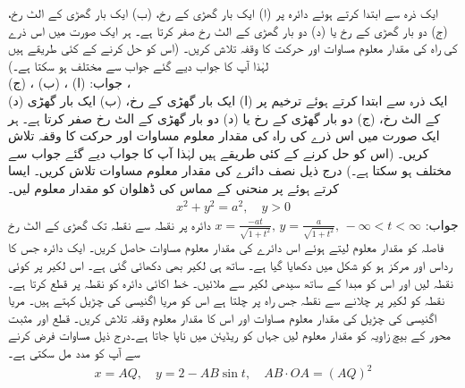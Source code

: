 ایک ذرہ  سے ابتدا کرتے ہوئے دائرہ   پر (ا) ایک بار گھڑی کے رخ، (ب) ایک بار گھڑی کے الٹ رخ، (ج) دو بار گھڑی کے رخ یا (د) دو بار گھڑی کے الٹ رخ صفر کرتا ہے۔ ہر ایک صورت میں اس ذرے کی راہ کی مقدار معلوم مساوات اور حرکت کا وقفہ تلاش کریں۔ (اس کو حل کرنے کے کئی طریقے ہیں لہٰذا آپ کا  جواب دیے گئے جواب سے مختلف ہو سکتا ہے۔)\\
جواب:\quad
(ا) ، (ب) ، (ج) ،\\ (د) 
ایک ذرہ  سے ابتدا کرتے ہوئے ترخیم   پر  (ا) ایک بار گھڑی کے رخ، (ب) ایک بار گھڑی کے الٹ رخ، (ج) دو بار گھڑی کے رخ یا (د) دو بار گھڑی کے الٹ رخ صفر کرتا ہے۔ ہر ایک صورت میں اس ذرے کی راہ کی مقدار معلوم مساوات اور حرکت کا وقفہ تلاش کریں۔ (اس کو حل کرنے کے کئی طریقے ہیں لہٰذا آپ کا  جواب دیے گئے جواب سے مختلف ہو سکتا ہے۔)
درج ذیل نصف دائرے کی مقدار معلوم مساوات تلاش کریں۔ ایسا کرتے  ہوئے  پر منحنی کے مماس کی ڈھلوان  کو مقدار معلوم لیں۔
\begin{align*}
x^2+y^2=a^2,\quad y>0
\end{align*}
جواب:\quad
$x=\tfrac{-at}{\sqrt{1+t^2}},\, y=\tfrac{a}{\sqrt{1+t^2}},\, -\infty<t<\infty$
دائرہ  پر نقطہ  سے نقطہ  تک گھڑی کے الٹ رخ  فاصلہ  کو مقدار معلوم لیتے ہوئے  اس دائرے کی مقدار معلوم مساوات حاصل کریں۔
ایک دائرہ جس کا رداس  اور مرکز  ہو کو شکل  میں دکھایا گیا ہے۔ ساتھ ہی لکیر  بھی دکھائی گئی ہے۔ اس لکیر پر کوئی نقطہ  لیں اور اس کو مبدا  کے ساتھ سیدھی لکیر سے ملائیں۔ خط  اکائی دائرہ کو نقطہ  پر قطع کرتا ہے۔ نقطہ  کو لکیر  پر چلانے سے نقطہ  جس راہ پر چلتا ہے اس کو مریا اگنیسی کی چڑیل کہتے ہیں۔ مریا اگنیسی کی چڑیل کی مقدار معلوم مساوات اور اس کا مقدار معلوم وقفہ تلاش کریں۔ قطع  اور مثبت  محور کے بیچ زاویہ  کو مقدار معلوم لیں جہاں  کو ریڈیئن میں ناپا جاتا ہے۔درج ذیل مساوات فرض کرنے سے آپ کو مدد مل سکتی ہے۔
\begin{align*}
x=AQ,\quad y=2-AB\sin t,\quad AB\cdot OA=(AQ)^2
\end{align*}
